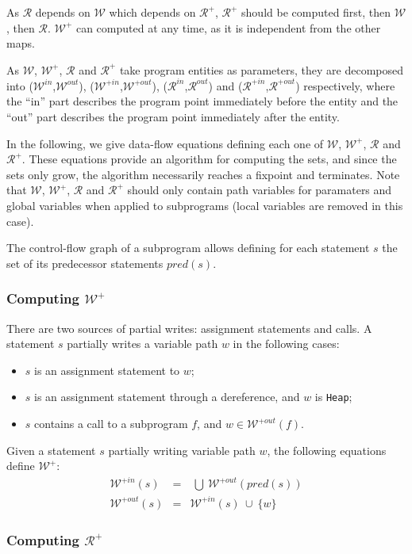 \documentclass{article}
\newcommand{\code}[1]{\texttt{#1}}
\newcommand{\heap}{\code{Heap}\xspace}
\newcommand{\pred}[1]{\ensuremath{\mathit{pred}(#1)}\xspace}
\newcommand{\allwrites}{$\mathcal{W^+}$\xspace}
\newcommand{\Outallwrites}{\ensuremath{\mathcal{W}^{+out}}\xspace}
\newcommand{\Inallwrites}{\ensuremath{\mathcal{W}^{+in}}\xspace}
\newcommand{\inallwrites}[1]{\ensuremath{\mathcal{W}^{+in}(#1)}\xspace}
\newcommand{\outallwrites}[1]{\ensuremath{\mathcal{W}^{+out}(#1)}\xspace}
\newcommand{\writes}{$\mathcal{W}$\xspace}
\newcommand{\Outwrites}{\ensuremath{\mathcal{W}^{out}}\xspace}
\newcommand{\Inwrites}{\ensuremath{\mathcal{W}^{in}}\xspace}
\newcommand{\allreads}{$\mathcal{R^+}$\xspace}
\newcommand{\Outallreads}{\ensuremath{\mathcal{R}^{+out}}\xspace}
\newcommand{\Inallreads}{\ensuremath{\mathcal{R}^{+in}}\xspace}
\newcommand{\reads}{$\mathcal{R}$\xspace}
\newcommand{\Inreads}{\ensuremath{\mathcal{R}^{in}}\xspace}
\newcommand{\Outreads}{\ensuremath{\mathcal{R}^{out}}\xspace}
\newcommand{\union}{~\cup~}
\newcommand{\bigunion}{~\bigcup~}
\begin{document}
As \reads depends on \writes which depends on \allreads, \allreads should be
computed first, then \writes, then \reads. \allwrites can computed at any time, as it is independent from the other maps.

As \writes, \allwrites, \reads and
\allreads take program entities as parameters, they are decomposed into
(\Inwrites,\Outwrites), (\Inallwrites,\Outallwrites), (\Inreads,\Outreads) and
(\Inallreads,\Outallreads) respectively, where the ``in'' part describes the
program point immediately before the entity and the ``out'' part describes the
program point immediately after the entity.

In the following, we give data-flow equations defining each one of \writes,
\allwrites, \reads and \allreads. These equations provide an algorithm for
computing the sets, and since the sets only grow, the algorithm necessarily
reaches a fixpoint and terminates. Note that \writes, \allwrites, \reads and
\allreads should only contain path variables for paramaters and global
variables when applied to subprograms (local variables are removed in this
case).

The control-flow graph of a subprogram allows defining for each statement $s$
the set of its predecessor statements \pred{s}.

\subsubsection{Computing \allwrites}

There are two sources of partial writes: assignment statements and calls. A
statement $s$ partially writes a variable path $w$ in the following cases:
\begin{itemize}
\item $s$ is an assignment statement to $w$;
\item $s$ is an assignment statement through a dereference, and $w$ is \heap;
\item $s$ contains a call to a subprogram $f$, and $w \in \outallwrites{f}$.
\end{itemize}

Given a statement $s$ partially writing variable path $w$, the following
equations define \allwrites:
\begin{eqnarray*}
\inallwrites{s} &=& \bigunion \outallwrites{\pred{s}}\\
\outallwrites{s} &=& \inallwrites{s} \union \{w\}
\end{eqnarray*}

\subsubsection{Computing \allreads}
\end{document}
